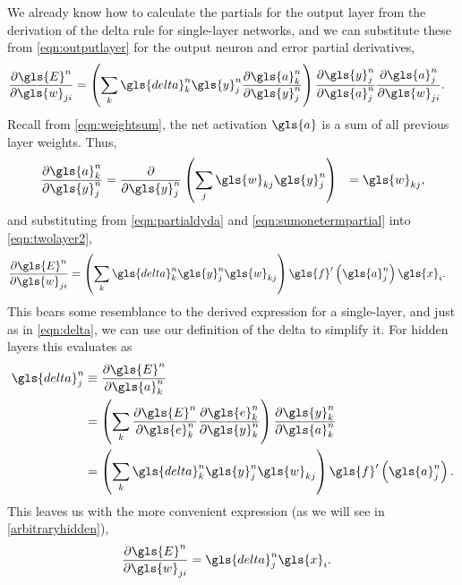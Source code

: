 \documentclass[thesis]{subfiles}
\begin{document}
We already know how to calculate the partials for the output layer from the derivation of the delta rule for single-layer networks, and we can substitute these from \cref{eqn:outputlayer} for the output neuron and error partial derivatives,
%
\begin{equation}
\begin{aligned}
    \frac{\partial \gls{E}^n}{\partial \gls{w}_{ji}} &= \left( \sum_k \gls{delta}^n_k \gls{y}^n_j \frac{\partial \gls{a}^n_k}{\partial \gls{y}^n_{j}}\right)
     \frac{\partial \gls{y}^n_{j}}{\partial \gls{a}^n_{j}} \frac{\partial \gls{a}^n_{j}}{\partial \gls{w}_{ji}}.
     \label{eqn:twolayer2}
\end{aligned}
\end{equation}
%
Recall from \cref{eqn:weightsum}, the net activation $\gls{a}$ is a sum of all previous layer weights. Thus,
\begin{equation}
\begin{aligned}
    \frac{\partial \gls{a}^n_k}{\partial \gls{y}^n_{j}} &= \frac{\partial}{\partial \gls{y}^n_{j}}\left(\sum_j \gls{w}_{kj} \gls{y}^n_{j} \right) &= \gls{w}_{kj},
\end{aligned}
\end{equation}
%
and substituting from \cref{eqn:partialdyda} and \cref{eqn:sumonetermpartial} into \cref{eqn:twolayer2},
\begin{equation}
\begin{aligned}
    \frac{\partial \gls{E}^n}{\partial \gls{w}_{ji}} &= \left( \sum_k \gls{delta}^n_k \gls{y}^n_j \gls{w}_{kj}\right)
	\gls{f}'\left( \gls{a}^n_j \right) \gls{x}_i.
     \label{eqn:twolayer3}
\end{aligned}
\end{equation}
%
This bears some resemblance to the derived expression for a single-layer, and just as in \cref{eqn:delta}, we can use our definition of the delta to simplify it. For hidden layers this evaluates as
\begin{equation}
\label{eqn:deltahidden}
\begin{aligned}
    \gls{delta}^n_j &\equiv \frac{\partial \gls{E}^n}{\partial \gls{a}^n_k}\\
    &= \left( \sum_k \frac{\partial \gls{E}^n}{\partial \gls{e}^n_{k}} \frac{\partial \gls{e}^n_{k}}{\partial \gls{y}^n_{k}} \right) \frac{\partial \gls{y}^n_{k}}{\partial \gls{a}^n_k}\\
    &= \left(\sum_k \gls{delta}^n_k \gls{y}^n_j \gls{w}_{kj} \right) \gls{f}'\left( \gls{a}^n_j \right).
\end{aligned}
\end{equation}
%
This leaves us with the more convenient expression (as we will see in \cref{arbitraryhidden}),
\begin{equation}
\begin{aligned}
    \frac{\partial \gls{E}^n}{\partial \gls{w}_{ji}} &=  \gls{delta}^n_j \gls{x}_i.
     \label{eqn:twolayer4}
\end{aligned}
\end{equation}
%
\end{document}
